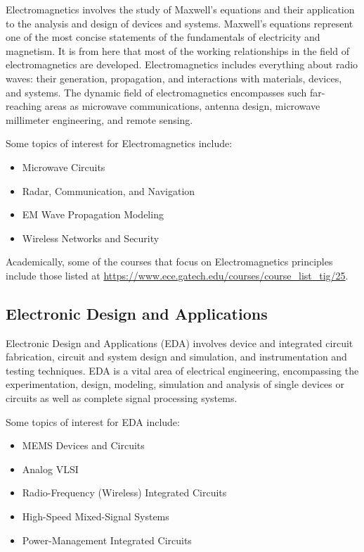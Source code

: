 \documentclass[12pt]{article}
\begin{document}
Electromagnetics involves the study of Maxwell's equations and their application to the analysis and design of devices and systems. Maxwell's equations represent one of the most concise statements of the fundamentals of electricity and magnetism. It is from here that most of the working relationships in the field of electromagnetics are developed. Electromagnetics includes everything about radio waves: their generation, propagation, and interactions with materials, devices, and systems. The dynamic field of electromagnetics encompasses such far-reaching areas as microwave communications, antenna design, microwave millimeter engineering, and remote sensing.

Some topics of interest for Electromagnetics include:

\begin{itemize}
    \item Microwave Circuits
    \item Radar, Communication, and Navigation
    \item EM Wave Propagation Modeling
    \item Wireless Networks and Security
\end{itemize}

Academically, some of the courses that focus on Electromagnetics principles include those listed at \url{https://www.ece.gatech.edu/courses/course_list_tig/25}.

\subsection{Electronic Design and Applications}

Electronic Design and Applications (EDA) involves device and integrated circuit fabrication, circuit and system design and simulation, and instrumentation and testing techniques. EDA is a vital area of electrical engineering, encompassing the experimentation, design, modeling, simulation and analysis of single devices or circuits as well as complete signal processing systems.

Some topics of interest for EDA include:

\begin{itemize}
    \item MEMS Devices and Circuits
    \item Analog VLSI
    \item Radio-Frequency (Wireless) Integrated Circuits
    \item High-Speed Mixed-Signal Systems
    \item Power-Management Integrated Circuits
\end{itemize}
\end{document}
